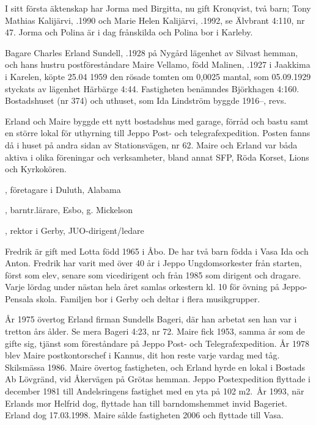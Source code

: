I sitt första äktenskap har Jorma med Birgitta, nu gift Kronqvist, två barn; Tony Mathias Kalijärvi,	.1990 och Marie Helen Kalijärvi, .1992, se Älvbrant 4:110, nr 47. Jorma och Polina är i dag frånskilda och Polina bor i Karleby.


Bagare Charles Erland Sundell, .1928 på Nygård lägenhet av Silvast hemman, och hans hustru 		postföreståndare Maire Vellamo, född Malinen, .1927 i Jaakkima i Karelen, köpte 25.04 1959 den rösade tomten om 0,0025 mantal, som 05.09.1929 styckats av lägenhet Härbärge 4:44. Fastigheten benämndes Björkhagen 4:160. Bostadshuset (nr 374) och uthuset, som Ida Lindström byggde 1916--, revs.

Erland och Maire byggde ett nytt bostadshus med garage, förråd och bastu samt en större lokal för uthyrning till Jeppo 	Post- och telegrafexpedition. Posten fanns då i huset på andra sidan av Stationsvägen, nr 62.	Maire och Erland var båda aktiva i olika föreningar och	verksamheter, bland annat SFP, Röda Korset, Lions och	Kyrkokören.
\begin{jhchildren}
  \item {}, företagare i Duluth, Alabama
  \item {}, barntr.lärare, Esbo, g. Mickelson
  \item {}, rektor i Gerby, JUO-dirigent/ledare
\end{jhchildren}
Fredrik är gift med Lotta född 1965 i Åbo. De har två barn födda i Vasa Ida och Anton. Fredrik har varit med över 40 år i Jeppo Ungdomsorkester från starten, först som elev, senare som vicedirigent och från 1985 som dirigent och dragare. Varje lördag under nästan hela året samlas orkestern kl. 10 för övning på Jeppo-Pensala	skola. Familjen bor i Gerby och deltar i flera musikgrupper.

År 1975 övertog Erland firman Sundells Bageri, där han arbetat sen han var i tretton års ålder. Se mera Bageri 4:23, nr 72. Maire fick 1953, samma år som de gifte sig, tjänst som föreståndare på Jeppo Post- och Telegrafexpedition. År 1978 blev Maire postkontorschef i Kannus, dit hon reste varje vardag med tåg. Skilsmässa 1986. Maire övertog fastigheten, och Erland hyrde en lokal i Bostads Ab Lövgränd, vid Åkervägen på Grötas hemman. Jeppo Postexpedition flyttade i december 1981 till Andelsringens fastighet med en yta på 102 m2. År 1993, när Erlands mor Helfrid dog, flyttade han till barndomshemmet invid Bageriet. Erland dog 17.03.1998. Maire sålde fastigheten 2006 och flyttade till Vasa.


